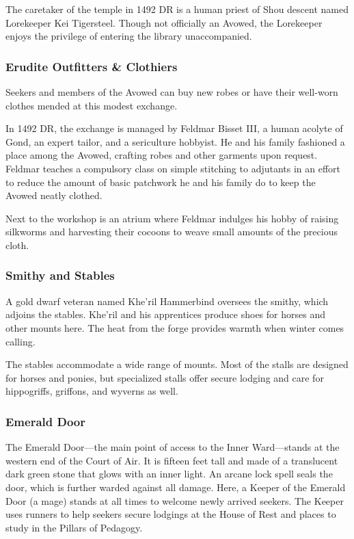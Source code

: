 \documentclass[10pt,a4paper,twoside,bg=print,twocolumn,openany,nodeprecatedcode]{dndbook}
\begin{document}
The caretaker of the temple in 1492 DR is a human priest of Shou descent named Lorekeeper Kei Tigersteel. Though not officially an Avowed, the Lorekeeper enjoys the privilege of entering the library unaccompanied.

\subsubsection{Erudite Outfitters \& Clothiers}
Seekers and members of the Avowed can buy new robes or have their well-worn clothes mended at this modest exchange.

In 1492 DR, the exchange is managed by Feldmar Bisset III, a human acolyte of Gond, an expert tailor, and a sericulture hobbyist. He and his family fashioned a place among the Avowed, crafting robes and other garments upon request. Feldmar teaches a compulsory class on simple stitching to adjutants in an effort to reduce the amount of basic patchwork he and his family do to keep the Avowed neatly clothed.

Next to the workshop is an atrium where Feldmar indulges his hobby of raising silkworms and harvesting their cocoons to weave small amounts of the precious cloth.

\subsubsection{Smithy and Stables}
A gold dwarf veteran named Khe'ril Hammerbind oversees the smithy, which adjoins the stables. Khe'ril and his apprentices produce shoes for horses and other mounts here. The heat from the forge provides warmth when winter comes calling.

The stables accommodate a wide range of mounts. Most of the stalls are designed for horses and ponies, but specialized stalls offer secure lodging and care for hippogriffs, griffons, and wyverns as well.

\subsubsection{Emerald Door}
The Emerald Door—the main point of access to the Inner Ward—stands at the western end of the Court of Air. It is fifteen feet tall and made of a translucent dark green stone that glows with an inner light. An arcane lock spell seals the door, which is further warded against all damage. Here, a Keeper of the Emerald Door (a mage) stands at all times to welcome newly arrived seekers. The Keeper uses runners to help seekers secure lodgings at the House of Rest and places to study in the Pillars of Pedagogy.
\end{document}

